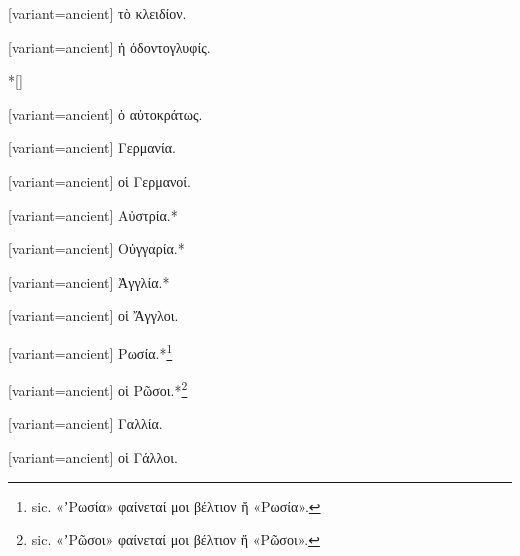 \switchcolumn*
{}%
\switchcolumn
\begin{greek}[variant=ancient]%
τὸ κλειδίον.%
\end{greek}%
\switchcolumn*
{}%
\switchcolumn
\begin{greek}[variant=ancient]%
ἡ ὀδοντογλυφίς.%
\end{greek}%
\switchcolumn*
\switchcolumn[0]*[\StarOrnament]%
\switchcolumn
\begin{greek}[variant=ancient]%
ὁ αὐτοκράτως.%
\end{greek}%
\switchcolumn*
{}%
\switchcolumn
\begin{greek}[variant=ancient]%
Γερμανία.%
\end{greek}%
\switchcolumn*
{}%
\switchcolumn
\begin{greek}[variant=ancient]%
οἱ Γερμανοί.%
\end{greek}%
\switchcolumn*
{}%
\switchcolumn
\begin{greek}[variant=ancient]%
Αὐστρία.{*}%
\end{greek}%
\switchcolumn*
{}%
\switchcolumn
\begin{greek}[variant=ancient]%
Οὐγγαρία.{*}%
\end{greek}%
\switchcolumn*
{}%
\switchcolumn
\begin{greek}[variant=ancient]%
Ἀγγλία.{*}%
\end{greek}%
\switchcolumn*
{}%
\switchcolumn
\begin{greek}[variant=ancient]%
οἱ Ἄγγλοι.%
\end{greek}%
\switchcolumn*
{}%
\switchcolumn
\begin{greek}[variant=ancient]%
Ρωσία.{*}\footnote{\textlatin{%
sic.\textgreek{ «ʼΡωσία» φαίνεταί μοι βέλτιον ἤ «Ρωσία».}}%
}
%
\end{greek}%
\switchcolumn*
{}%
\switchcolumn
\begin{greek}[variant=ancient]%
οἱ Ρῶσοι.{*}\footnote{\textlatin{%
sic.\textgreek{ «ʼΡῶσοι» φαίνεταί μοι βέλτιον ἤ «Ρῶσοι».}}%
}
%
\end{greek}%
\switchcolumn*
{}%
\switchcolumn
\begin{greek}[variant=ancient]%
Γαλλία.%
\end{greek}%
\switchcolumn*
{}%
\switchcolumn
\begin{greek}[variant=ancient]%
οἱ Γάλλοι.%
\end{greek}%
